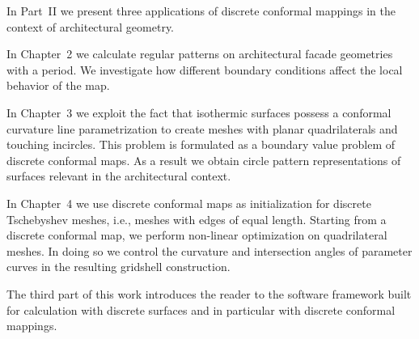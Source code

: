 \documentclass[Thesis.tex]{subfiles}
\begin{document}
In Part~II we present three applications of discrete conformal mappings in the context of architectural geometry. 

In Chapter~2 we calculate regular patterns on architectural facade geometries with a period. 
We investigate how different boundary conditions affect the local behavior of the map.

In Chapter~3 we exploit the fact that isothermic surfaces possess a conformal curvature line parametrization to create meshes with planar quadrilaterals and touching incircles. 
This problem is formulated as a boundary value problem of discrete conformal maps.
As a result we obtain circle pattern representations of surfaces relevant in the architectural context.

In Chapter~4 we use discrete conformal maps as initialization for discrete Tschebyshev meshes, i.e., meshes with  edges of equal length. 
Starting from a discrete conformal map, we perform non-linear optimization on quadrilateral meshes.
In doing so we control the curvature and intersection angles of parameter curves in the resulting gridshell construction.

The third part of this work introduces the reader to the software framework built for calculation with discrete surfaces and in particular with discrete conformal mappings.


\subfilebibliography
\end{document}
